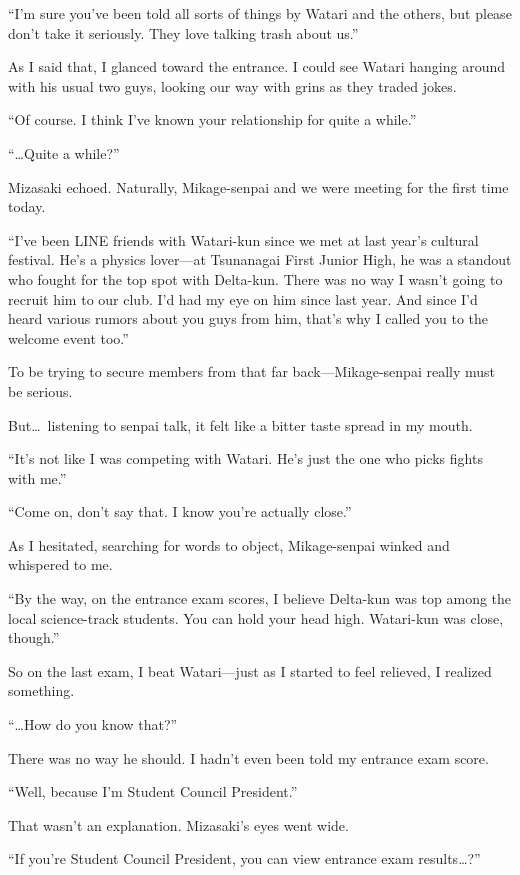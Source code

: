 \documentclass[
    a4paper,
    12pt,
    twoside,
    openany,
    UTF8,
    fontset=windows
]{ctexbook}
\begin{document}
``I'm sure you've been told all sorts of things by Watari and the others, but please don't take it seriously. They love talking trash about us.''

As I said that, I glanced toward the entrance. I could see Watari hanging around with his usual two guys, looking our way with grins as they traded jokes.

``Of course. I think I've known your relationship for quite a while.''

``\dots Quite a while?''

Mizasaki echoed. Naturally, Mikage-senpai and we were meeting for the first time today.

``I've been LINE friends with Watari-kun since we met at last year's cultural festival. He's a physics lover---at Tsunanagai First Junior High, he was a standout who fought for the top spot with Delta-kun. There was no way I wasn't going to recruit him to our club. I'd had my eye on him since last year. And since I'd heard various rumors about you guys from him, that's why I called you to the welcome event too.''

To be trying to secure members from that far back---Mikage-senpai really must be serious.

But\dots\ listening to senpai talk, it felt like a bitter taste spread in my mouth.

``It's not like I was competing with Watari. He's just the one who picks fights with me.''

``Come on, don't say that. I know you're actually close.''

As I hesitated, searching for words to object, Mikage-senpai winked and whispered to me.

``By the way, on the entrance exam scores, I believe Delta-kun was top among the local science-track students. You can hold your head high. Watari-kun was close, though.''

So on the last exam, I beat Watari---just as I started to feel relieved, I realized something.

``\dots How do you know that?''

There was no way he should. I hadn't even been told my entrance exam score.

``Well, because I'm Student Council President.''

That wasn't an explanation. Mizasaki's eyes went wide.

``If you're Student Council President, you can view entrance exam results\dots?''
\end{document}
